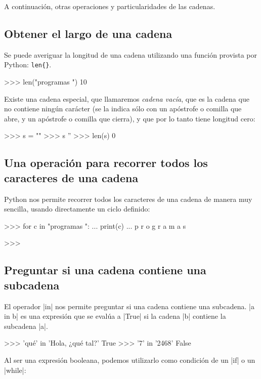 A continuación, otras operaciones y particularidades de las cadenas.

\subsection{Obtener el largo de una cadena}

Se puede averiguar la longitud de una cadena utilizando
una función provista por Python: \lstinline+len{}+.
\begin{codigo-python-sn}
>>> len("programas ")
10
\end{codigo-python-sn}

Existe una cadena especial, que llamaremos {\it cadena vacía}, que
es la cadena que no contiene ningún carácter (se la indica sólo con
un apóstrofe o comilla que abre, y un apóstrofe o comilla que cierra),
y que por lo tanto tiene longitud cero:

\begin{codigo-python-sn}
>>> s = ""
>>> s
''
>>> len(s)
0
\end{codigo-python-sn}

\subsection[Recorrer una cadena]{Una operación para recorrer todos los caracteres de una cadena}

Python nos permite recorrer todos los caracteres de una cadena de
manera muy sencilla, usando directamente un ciclo definido:

\begin{codigo-python-sn}
>>> for c in "programas ":
...     print(c)
...
p
r
o
g
r
a
m
a
s

>>>
\end{codigo-python-sn}

\subsection{Preguntar si una cadena contiene una subcadena}

El operador |in| nos permite preguntar si una cadena contiene una
subcadena. |a in b| es una expresión que se evalúa a |True| si la cadena |b|
contiene la subcadena |a|.

\begin{codigo-python-sn}
>>> 'qué' in 'Hola, ¿qué tal?'
True
>>> '7' in '2468'
False
\end{codigo-python-sn}

Al ser una expresión booleana, podemos utilizarlo como condición de un |if| o
un |while|:

